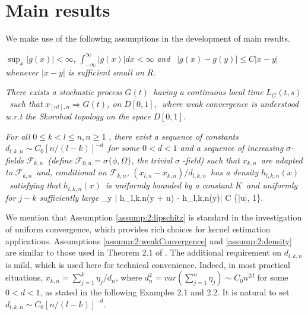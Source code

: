 \section{Main results}

We make use of the following assumptions in the development of main results.

\begin{assump} 
	$\sup_x|g(x)|<\infty$, $\int_{-\infty}^{\infty}|g(x)|dx<\infty$ \textit{and }\textit{\
	$|g(x)-g(y)|\le C|x-y|$ whenever  $|x-y|$ is sufficient small on }$R$.
\end{assump}

\begin{assump} 
\textit{There exists a stochastic process }%
$G(t)$\textit{\ having a continuous local time
}$L_{G}(t,s)$\textit{\ such that }$x_{[nt],n}\Rightarrow
G(t)$\textit{, on }$D[0,1],$\textit{\ where
weak convergence is understood w.r.t the Skorohod topology on the space }$%
D[0,1]$\textit{.}
\end{assump}

\begin{assump} 
 \textit{For all }$0\leq k<l\leq n,n\geq 1$ \textit{, there exist a sequence of constants }$d_{l,k,n}\sim C_0 [n/(l-k)]^{-d}$\textit{\ for some $0< d<1$
and a
sequence of increasing }$\sigma $\textit{-fields }${\mathcal F}_{k,n}$\textit{\ (define }$%
{\mathcal F}_{0,n}=\sigma \{\phi ,\Omega \}$\textit{, the trivial }$\sigma $\textit{%
-field) such that} $x_{k,n}$\textit{\ are adapted to }${\mathcal F}_{k,n}$\textit{\
and, conditional on }${\mathcal F}_{k,n}$\textit{,
}$(x_{l,n}-x_{k,n})/d_{l,k,n}$\textit{\ has a density
}$h_{l,k,n}(x)$\textit{\ satisfying that }$h_{l,k,n}(x)$\textit{\ is
uniformly bounded by a constant }$K$\textit{\ and uniformly for $j-k$ sufficiently large}
\be
 \sup_y | h_{l,k,n}(y + u) - h_{l,k,n}(y)| \le C \min\{|u|, 1\}. \la {eqn:2:77}
\ee
\end{assump}

We mention that Assumption \ref{assump:2:lipschitz} is standard in the investigation of uniform convergence,
which provides rich choices for kernel estimation applications. Assumptions \ref{assump:2:weakConvergence} and \ref{assump:2:density} are similar to those used in Theorem 2.1 of \cite{wangphillips2010a}. The additional requirement on $d_{l,k,n}$ is mild, which is used here for technical convenience.
Indeed, in  most practical situations, $x_{k,n}=\sum_{j=1}^k \eta_j/d_n$, where $d_n^2= var (\sum_{j=1}^n\eta_j)\sim C_0n^{2d}$ for some $0< d<1$, as stated in the following Examples 2.1 and 2.2. It is natural to set $d_{l,k,n}\sim C_0 [n/(l-k)]^{-d}$.


